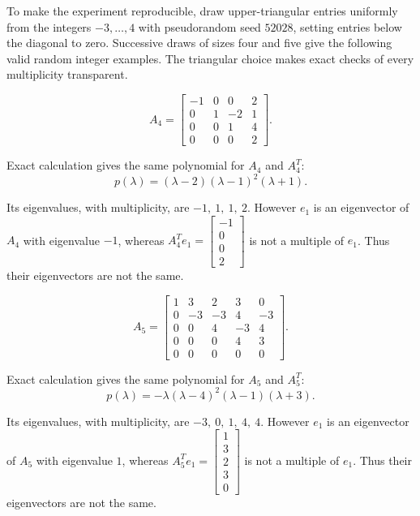 To make the experiment reproducible, draw upper-triangular entries
uniformly from the integers $-3,\ldots,4$ with pseudorandom seed
$52028$, setting entries below the diagonal to zero. Successive draws
of sizes four and five give the following valid random integer examples.
The triangular choice makes exact checks of every multiplicity transparent.


\[ A_4=\begin{bmatrix}-1 & 0 & 0 & 2\\0 & 1 & -2 & 1\\0 & 0 & 1 & 4\\0 & 0 & 0 & 2\end{bmatrix}.\]

Exact calculation gives the same polynomial for $A_4$ and $A_4^T$:
\[ p(\lambda)=\left(\lambda - 2\right) \left(\lambda - 1\right)^{2} \left(\lambda + 1\right).\]

Its eigenvalues, with multiplicity, are $-1,\ 1,\ 1,\ 2$. However $e_1$ is an eigenvector of $A_4$ with eigenvalue $-1$, whereas $A_4^Te_1=\begin{bmatrix}-1\\0\\0\\2\end{bmatrix}$ is not a multiple of $e_1$. Thus their eigenvectors are not the same.


\[ A_5=\begin{bmatrix}1 & 3 & 2 & 3 & 0\\0 & -3 & -3 & 4 & -3\\0 & 0 & 4 & -3 & 4\\0 & 0 & 0 & 4 & 3\\0 & 0 & 0 & 0 & 0\end{bmatrix}.\]

Exact calculation gives the same polynomial for $A_5$ and $A_5^T$:
\[ p(\lambda)=- \lambda \left(\lambda - 4\right)^{2} \left(\lambda - 1\right) \left(\lambda + 3\right).\]

Its eigenvalues, with multiplicity, are $-3,\ 0,\ 1,\ 4,\ 4$. However $e_1$ is an eigenvector of $A_5$ with eigenvalue $1$, whereas $A_5^Te_1=\begin{bmatrix}1\\3\\2\\3\\0\end{bmatrix}$ is not a multiple of $e_1$. Thus their eigenvectors are not the same.

